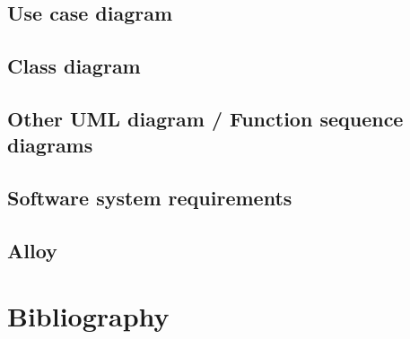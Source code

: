 \documentclass[12pt, a4paper]{article}
\begin{document}
	\subsection{Use case diagram}
	
	\subsection{Class diagram}
	
	\subsection{Other UML diagram / Function sequence diagrams}

	
	\subsection{Software system requirements}

	
	\subsection{Alloy}


\newpage
\section{Bibliography}
\end{document}
